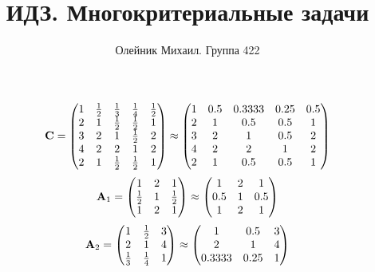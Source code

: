 \documentclass[10pt,a4paper]{article}
\title{ИДЗ. Многокритериальные задачи}
\author{Олейник Михаил. Группа 422}
\begin{document}
	\maketitle
	
	\[
		\bold{C} = 
		\begin{pmatrix}
			{1} {} & \frac{1} {{2}} & \frac{1} {{3}} & \frac{1} {{4}} & \frac{1} {{2}} \\
			{{2}} {} & {1} {} & \frac{1} {{2}} & \frac{1} {{2}} & {1} {} \\
			{{3}} {} & {{2}} {} & {1} {} & \frac{1} {{2}} & {{2}} {} \\
			{{4}} {} & {{2}} {} & {{2}} {} & {1} {} & {{2}} {} \\
			{{2}} {} & {1} {} & \frac{1} {{2}} & \frac{1} {{2}} & {1} {} \\
		\end{pmatrix}
		\approx
		\begin{pmatrix}
			1        & 0.5      & 0.3333   & 0.25     & 0.5      \\
			2        & 1        & 0.5      & 0.5      & 1        \\
			3        & 2        & 1        & 0.5      & 2        \\
			4        & 2        & 2        & 1        & 2        \\
			2        & 1        & 0.5      & 0.5      & 1        \\
		\end{pmatrix}
	\]
	\[
		\bold{A}_{1} = 
		\begin{pmatrix}
			{1} {} & {{2}} {} & {1} {} \\
			\frac{1} {{2}} & {1} {} & \frac{1} {{2}} \\
			{1} {} & {{2}} {} & {1} {} \\
		\end{pmatrix}
		\approx
		\begin{pmatrix}
			1        & 2        & 1        \\
			0.5      & 1        & 0.5      \\
			1        & 2        & 1        \\
		\end{pmatrix}
	\]
	\[
		\bold{A}_{2} = 
		\begin{pmatrix}
			{1} {} & \frac{1} {{2}} & {{3}} {} \\
			{{2}} {} & {1} {} & {{4}} {} \\
			\frac{1} {{3}} & \frac{1} {{4}} & {1} {} \\
		\end{pmatrix}
		\approx
		\begin{pmatrix}
			1        & 0.5      & 3        \\
			2        & 1        & 4        \\
			0.3333   & 0.25     & 1        \\
		\end{pmatrix}
	\]
\end{document}
